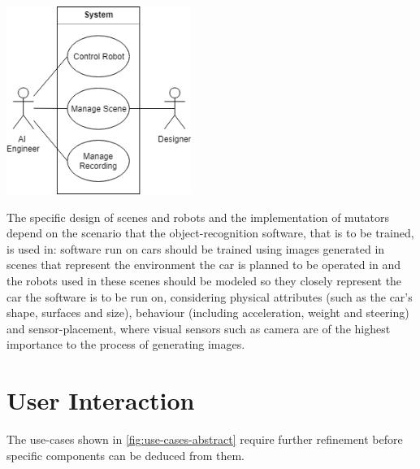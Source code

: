 \begin{center}
\noindent\includegraphics[width=6cm]{tex/img/ch04/UseCases_HighLevel_01.png}
\label{fig:use-cases-abstract}
\end{center}

The specific design of scenes and robots and the implementation of mutators depend on the scenario that the object-recognition software, that is to be trained, is used in: software run on cars should be trained using images generated in scenes that represent the environment the car is planned to be operated in and the robots used in these scenes should be modeled so they closely represent the car the software is to be run on, considering physical attributes (such as the car's shape, surfaces and size), behaviour (including acceleration, weight and steering)  and sensor-placement, where visual sensors such as camera are of the highest importance to the process of generating images.


\section{User Interaction}
The use-cases shown in \ref{fig:use-cases-abstract} require further refinement before specific components can be deduced from them.

